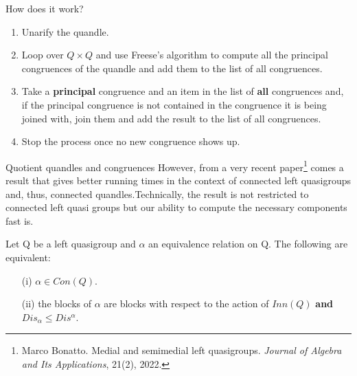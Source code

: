 \begin{frame}{How does it work?}
    \begin{enumerate}
        \item Unarify the quandle.
        \item Loop over $Q\times Q$ and use Freese's algorithm to compute all the principal congruences of the quandle and add them to the list of all congruences.
        
        \item Take a \textbf{principal} congruence and an item in the list of \textbf{all} congruences and, if the principal congruence is not contained in the congruence it is being joined with, join them and add the result to the list of all congruences. 
        \item Stop the process once no new congruence shows up.
    \end{enumerate}
\end{frame}
\begin{frame}{Quotient quandles and congruences}
However, from a very recent paper\footnote{Marco Bonatto. Medial and semimedial left quasigroups. \textit{Journal of Algebra and Its Applications}, 21(2), 2022. } comes a result that gives better running times in the context of connected left quasigroups and, thus, connected quandles.\newline\newline Technically, the result is not restricted to connected left quasi groups but our ability to compute the necessary components fast is. 
\begin{lemma}
Let Q be a left quasigroup and $\alpha$ an equivalence relation on Q. The following are equivalent:
\begin{itemize}
    \item[(i)] $\alpha \in Con(Q)$.
    \item[(ii)] the blocks of $\alpha$ are blocks with respect to the action of $Inn(Q)$ \textbf{and} $Dis_\alpha \leq Dis^\alpha$.
\end{itemize}

\end{lemma}


\end{frame}

